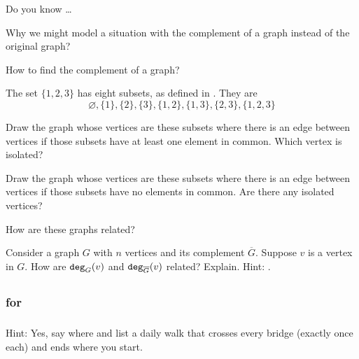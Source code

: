 \begin{exer}[\exerR] %
\label{exer_dyk_graph_comp}
    Do you know \ldots
        \begin{exerpart}
            \item Why we might model a situation with the complement of a graph instead of the original graph?
           \item How to find the complement of a graph?
        \end{exerpart}
\end{exer}

\begin{exer}[\exerE] %
\label{exer_intersection_graphs}
    The set $\{1,2,3\}$ has eight subsets, as defined in .  They are
    $$\varnothing, \{1\}, \{2\}, \{3\},\{1,2\}, \{1,3\}, \{2,3\}, \{1,2,3\}$$
    \begin{exerpart}
        \item Draw the graph whose vertices are these subsets where there is an edge between vertices if those subsets have at least one element in common.  Which vertex is isolated?
        \item Draw the graph whose vertices are these subsets where there is an edge between vertices if those subsets have no elements in common. Are there any isolated vertices?
        \item How are these graphs related?
    \end{exerpart}
\end{exer}

\begin{exer}[\exerE] %
\label{exer_deg_in_comp}
    Consider a graph $G$ with $n$ vertices and its complement $\overline{G}$.  Suppose $v$ is a vertex in $G$.  How are $\texttt{deg}_G(v)$ and $\texttt{deg}_{\overline{G}}(v)$ related?  Explain.  Hint: .
\end{exer}

\subsection{\answers}

\subsubsection{\answers for  \subbridges}

\subsubsection*{ \answers}
Hint: Yes, say where and list a daily walk that crosses every bridge (exactly once each) and ends where you start.

